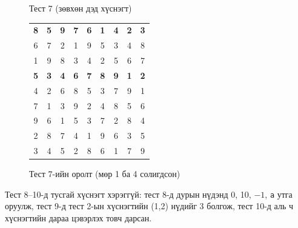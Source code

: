 \documentclass[12pt,a4paper]{report}
\newcommand{\sgrid}[9]{{\small\setlength{\tabcolsep}{3.5pt}\begin{tabular}{|ccc|ccc|ccc|}\hline #1\\#2\\#3\\\hline #4\\#5\\#6\\\hline #7\\#8\\#9\\\hline\end{tabular}}}
\begin{document}
\begin{figure}[H]\centering
\begin{minipage}[t]{0.4\textwidth}\centering Тест 7 (зөвхөн дэд хүснэгт)\par\sgrid{\textbf{8}&\textbf{5}&\textbf{9}&\textbf{7}&\textbf{6}&\textbf{1}&\textbf{4}&\textbf{2}&\textbf{3}}{6&7&2&1&9&5&3&4&8}{1&9&8&3&4&2&5&6&7}{\textbf{5}&\textbf{3}&\textbf{4}&\textbf{6}&\textbf{7}&\textbf{8}&\textbf{9}&\textbf{1}&\textbf{2}}{4&2&6&8&5&3&7&9&1}{7&1&3&9&2&4&8&5&6}{9&6&1&5&3&7&2&8&4}{2&8&7&4&1&9&6&3&5}{3&4&5&2&8&6&1&7&9}\end{minipage}
\caption{Тест 7-ийн оролт (мөр 1 ба 4 солигдсон)}\label{fig:g3}
\end{figure}
Тест 8--10-д тусгай хүснэгт хэрэггүй: тест 8-д дурын нүдэнд 0, 10, $-1$, \texttt{a} утга оруулж, тест 9-д тест 2-ын хүснэгтийн (1,2) нүдийг 3 болгож, тест 10-д аль ч хүснэгтийн дараа цэвэрлэх товч дарсан.

\end{document}
